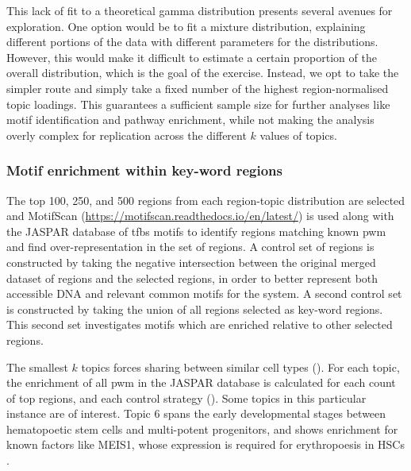 This lack of fit to a theoretical gamma distribution presents several avenues for exploration. One option would be to fit a mixture distribution, explaining different portions of the data with different parameters for the distributions. However, this would make it difficult to estimate a certain proportion of the overall distribution, which is the goal of the exercise. Instead, we opt to take the simpler route and simply take a fixed number of the highest region-normalised topic loadings. This guarantees a sufficient sample size for further analyses like motif identification and pathway enrichment, while not making the analysis overly complex for replication across the different $k$ values of topics.

\subsubsection{Motif enrichment within key-word regions}

The top 100, 250, and 500 regions from each region-topic distribution are selected and MotifScan (\url{https://motifscan.readthedocs.io/en/latest/}) is used along with the JASPAR database of \gls{tfbs} motifs to identify regions matching known \gls{pwm} and find over-representation in the set of regions. A control set of regions is constructed by taking the negative intersection between the original merged dataset of regions and the selected regions, in order to better represent both accessible DNA and relevant common motifs for the system. A second control set is constructed by taking the union of all regions selected as key-word regions. This second set investigates motifs which are enriched relative to other selected regions.

The smallest $k$ topics forces sharing between similar cell types (). For each topic, the enrichment of all \gls{pwm} in the JASPAR database is calculated for each count of top regions, and each control strategy (). Some topics in this particular instance are of interest. Topic 6 spans the early developmental stages between hematopoetic stem cells and multi-potent progenitors, and shows enrichment for known factors like MEIS1, whose expression is required for erythropoesis in HSCs \cite{Miller2016,Zeddies2014,Unnisa2012}.  

